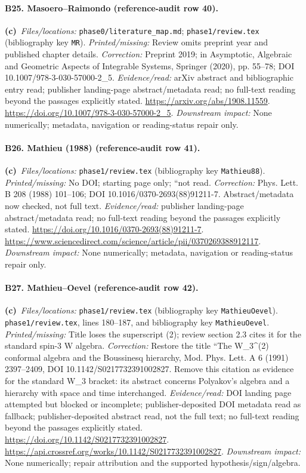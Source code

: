 \documentclass[11pt,a4paper]{article}
\newcommand{\C}{\textbf{(c)}\ }
\newcommand{\file}[1]{\nolinkurl{#1}}
\begin{document}
\paragraph{B25. Masoero--Raimondo (reference-audit row 40).}
\C \textit{Files/locations:} \file{phase0/literature_map.md}; \file{phase1/review.tex} (bibliography key \file{MR}).
\textit{Printed/missing:} Review omits preprint year and published chapter details.
\textit{Correction:} Preprint 2019; in Asymptotic, Algebraic and Geometric Aspects of Integrable Systems, Springer (2020), pp. 55--78; DOI 10.1007/978-3-030-57000-2\_5.
\textit{Evidence/read:} arXiv abstract and bibliographic entry read; publisher landing-page abstract/metadata read; no full-text reading beyond the passages explicitly stated.
\url{https://arxiv.org/abs/1908.11559}.
\url{https://doi.org/10.1007/978-3-030-57000-2_5}.
\textit{Downstream impact:} None numerically; metadata, navigation or reading-status repair only.
\paragraph{B26. Mathieu (1988) (reference-audit row 41).}
\C \textit{Files/locations:} \file{phase1/review.tex} (bibliography key \file{Mathieu88}).
\textit{Printed/missing:} No DOI; starting page only; ``not read.
\textit{Correction:} Phys. Lett. B 208 (1988) 101--106; DOI 10.1016/0370-2693(88)91211-7. Abstract/metadata now checked, not full text.
\textit{Evidence/read:} publisher landing-page abstract/metadata read; no full-text reading beyond the passages explicitly stated.
\url{https://doi.org/10.1016/0370-2693(88)91211-7}.
\url{https://www.sciencedirect.com/science/article/pii/0370269388912117}.
\textit{Downstream impact:} None numerically; metadata, navigation or reading-status repair only.
\paragraph{B27. Mathieu--Oevel (reference-audit row 42).}
\C \textit{Files/locations:} \file{phase1/review.tex} (bibliography key \file{MathieuOevel}).
\file{phase1/review.tex}, lines 180--187, and bibliography key \file{MathieuOevel}.
\textit{Printed/missing:} Title loses the superscript (2); review section 2.3 cites it for the standard spin-3 W algebra.
\textit{Correction:} Restore the title ``The W\_3\textasciicircum{}(2) conformal algebra and the Boussinesq hierarchy, Mod. Phys. Lett. A 6 (1991) 2397--2409, DOI 10.1142/S0217732391002827. Remove this citation as evidence for the standard W\_3 bracket: its abstract concerns Polyakov's algebra and a hierarchy with space and time interchanged.
\textit{Evidence/read:} DOI landing page attempted but blocked or incomplete; publisher-deposited DOI metadata read as fallback; publisher-deposited abstract read, not the full text; no full-text reading beyond the passages explicitly stated.
\url{https://doi.org/10.1142/S0217732391002827}.
\url{https://api.crossref.org/works/10.1142/S0217732391002827}.
\textit{Downstream impact:} None numerically; repair attribution and the supported hypothesis/sign/algebra.
\end{document}
